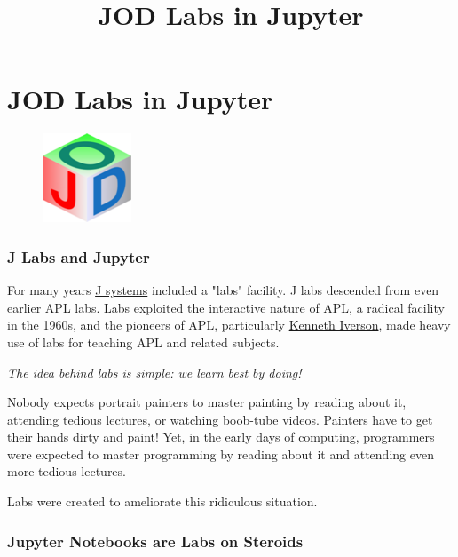 \documentclass[11pt,letter,landscape]{article}
\title{JOD Labs in Jupyter}
\makeatletter
\def\maxwidth{\ifdim\Gin@nat@width>\linewidth\linewidth
    \else\Gin@nat@width\fi}
\let\Oldincludegraphics\includegraphics
\renewcommand{\includegraphics}[1]{\Oldincludegraphics[width=.8\maxwidth]{#1}}
\makeatother
\begin{document}
    
    
    \maketitle
    
    

    
    \section{JOD Labs in Jupyter}\label{jod-labs-in-jupyter}

\begin{figure}
\centering
\includegraphics{inclusions/jodteenytinycube.png}
\caption{}
\end{figure}

    \subsubsection{J Labs and Jupyter}\label{j-labs-and-jupyter}

For many years \href{http://www.jsoftware.com/}{J systems} included a
"labs" facility. J labs descended from even earlier APL labs. Labs
exploited the interactive nature of APL, a radical facility in the
1960s, and the pioneers of APL, particularly
\href{https://en.wikipedia.org/wiki/Kenneth_E._Iverson}{Kenneth
Iverson}, made heavy use of labs for teaching APL and related subjects.

\emph{The idea behind labs is simple: we learn best by doing!}

Nobody expects portrait painters to master painting by reading about it,
attending tedious lectures, or watching boob-tube videos. Painters have
to get their hands dirty and paint! Yet, in the early days of computing,
programmers were expected to master programming by reading about it and
attending even more tedious lectures.

Labs were created to ameliorate this ridiculous situation.

    \subsubsection{Jupyter Notebooks are Labs on
Steroids}\label{jupyter-notebooks-are-labs-on-steroids}
\end{document}
